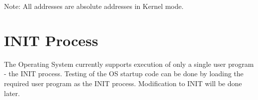 Note: All addresses are absolute addresses in Kernel mode. 
\section{INIT Process}
\label{lbl:INITprocess}
The Operating System currently supports execution of only a single user program - the INIT process. Testing of the OS startup code can be done by loading the required user program as the INIT process. Modification to INIT will be done later.
